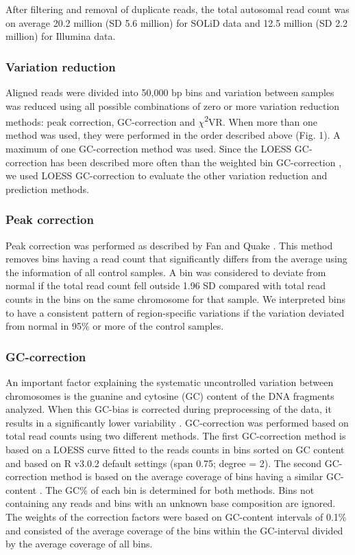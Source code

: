 After filtering and removal of duplicate reads, the total autosomal read count was on average 20.2 million (SD 5.6 million) for SOLiD data and 12.5 million (SD 2.2 million) for Illumina data.

\subsubsection{Variation reduction}
Aligned reads were divided into 50,000 bp bins and variation between samples was reduced using all possible combinations of zero or more variation reduction methods: peak correction, GC-correction and $\chi$\textsuperscript{2}VR. 
When more than one method was used, they were performed in the order described above (Fig. 1). 
A maximum of one GC-correction method was used. Since the LOESS GC-correction has been described more often \cite{Chen_2011,Lau_2012,Palomaki_2012,Liang_2013} than the weighted bin GC-correction \cite{Fan_2010}, we used LOESS GC-correction to evaluate the other variation reduction and prediction methods.

\subsubsection{Peak correction}
Peak correction was performed as described by Fan and Quake \cite{Fan_2010}. 
This method removes bins having a read count that significantly differs from the average using the information of all control samples. 
A bin was considered to deviate from normal if the total read count fell outside 1.96 SD compared with total read counts in the bins on the same chromosome for that sample. 
We interpreted bins to have a consistent pattern of region-specific variations if the variation deviated from normal in 95\% or more of the control samples.

\subsubsection{GC-correction}
An important factor explaining the systematic uncontrolled variation between chromosomes is the guanine and cytosine (GC) content of the DNA fragments analyzed. 
When this GC-bias is corrected during preprocessing of the data, it results in a significantly lower variability \cite{Liang_2013}. 
GC-correction was performed based on total read counts using two different methods. 
The first GC-correction method is based on a LOESS curve fitted to the reads counts in bins sorted on GC content \cite{Chen_2011,Lau_2012,Palomaki_2012,Liang_2013} and based on R v3.0.2 default settings (span 0.75; degree = 2). 
The second GC-correction method is based on the average coverage of bins having a similar GC-content \cite{Fan_2010}. 
The GC\% of each bin is determined for both methods. Bins not containing any reads and bins with an unknown base composition are ignored. 
The weights of the correction factors were based on GC-content intervals of 0.1\% and consisted of the average coverage of the bins within the GC-interval divided by the average coverage of all bins.

